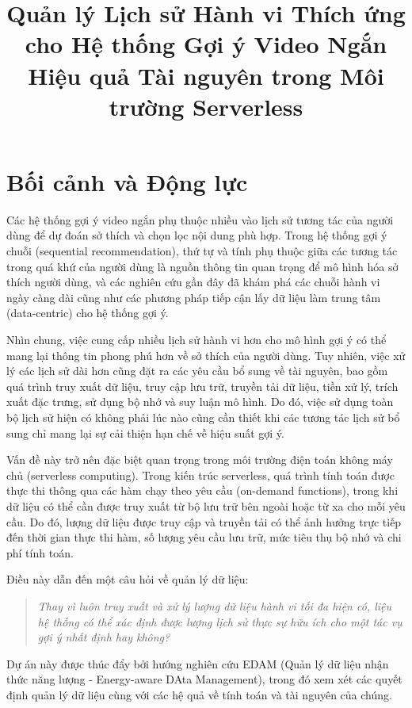 \documentclass[12pt,a4paper]{article}
\title{\textbf{Quản lý Lịch sử Hành vi Thích ứng cho Hệ thống Gợi ý Video Ngắn Hiệu quả Tài nguyên trong Môi trường Serverless}}
\author{}
\date{}
\begin{document}
\maketitle

\section{Bối cảnh và Động lực}

Các hệ thống gợi ý video ngắn phụ thuộc nhiều vào lịch sử tương tác của người dùng để dự đoán sở thích và chọn lọc nội dung phù hợp. Trong hệ thống gợi ý chuỗi (sequential recommendation), thứ tự và tính phụ thuộc giữa các tương tác trong quá khứ của người dùng là nguồn thông tin quan trọng để mô hình hóa sở thích người dùng, và các nghiên cứu gần đây đã khám phá các chuỗi hành vi ngày càng dài cũng như các phương pháp tiếp cận lấy dữ liệu làm trung tâm (data-centric) cho hệ thống gợi ý.

Nhìn chung, việc cung cấp nhiều lịch sử hành vi hơn cho mô hình gợi ý có thể mang lại thông tin phong phú hơn về sở thích của người dùng. Tuy nhiên, việc xử lý các lịch sử dài hơn cũng đặt ra các yêu cầu bổ sung về tài nguyên, bao gồm quá trình truy xuất dữ liệu, truy cập lưu trữ, truyền tải dữ liệu, tiền xử lý, trích xuất đặc trưng, sử dụng bộ nhớ và suy luận mô hình. Do đó, việc sử dụng toàn bộ lịch sử hiện có không phải lúc nào cũng cần thiết khi các tương tác lịch sử bổ sung chỉ mang lại sự cải thiện hạn chế về hiệu suất gợi ý.

Vấn đề này trở nên đặc biệt quan trọng trong môi trường điện toán không máy chủ (serverless computing). Trong kiến trúc serverless, quá trình tính toán được thực thi thông qua các hàm chạy theo yêu cầu (on-demand functions), trong khi dữ liệu có thể cần được truy xuất từ bộ lưu trữ bên ngoài hoặc từ xa cho mỗi yêu cầu. Do đó, lượng dữ liệu được truy cập và truyền tải có thể ảnh hưởng trực tiếp đến thời gian thực thi hàm, số lượng yêu cầu lưu trữ, mức tiêu thụ bộ nhớ và chi phí tính toán.

Điều này dẫn đến một câu hỏi về quản lý dữ liệu:

\begin{quote}
\textit{Thay vì luôn truy xuất và xử lý lượng dữ liệu hành vi tối đa hiện có, liệu hệ thống có thể xác định được lượng lịch sử thực sự hữu ích cho một tác vụ gợi ý nhất định hay không?}
\end{quote}

Dự án này được thúc đẩy bởi hướng nghiên cứu EDAM (Quản lý dữ liệu nhận thức năng lượng - Energy-aware DAta Management), trong đó xem xét các quyết định quản lý dữ liệu cùng với các hệ quả về tính toán và tài nguyên của chúng.
\end{document}
